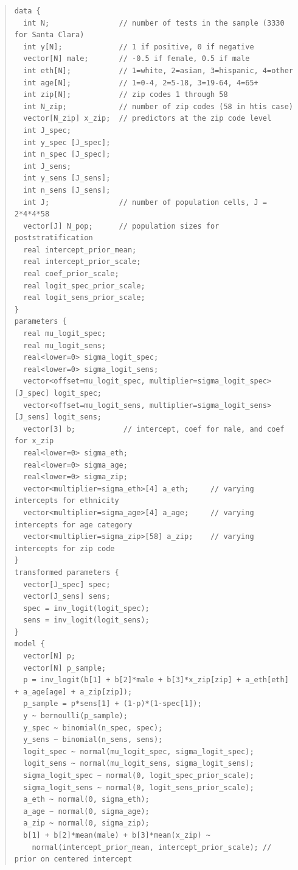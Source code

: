 \documentclass[11pt]{article}
\begin{document}
  \begin{small}
  \begin{quotation}\noindent
\begin{verbatim}
data {
  int N;                // number of tests in the sample (3330 for Santa Clara)
  int y[N];             // 1 if positive, 0 if negative
  vector[N] male;       // -0.5 if female, 0.5 if male
  int eth[N];           // 1=white, 2=asian, 3=hispanic, 4=other
  int age[N];           // 1=0-4, 2=5-18, 3=19-64, 4=65+
  int zip[N];           // zip codes 1 through 58
  int N_zip;            // number of zip codes (58 in htis case)
  vector[N_zip] x_zip;  // predictors at the zip code level
  int J_spec;
  int y_spec [J_spec];
  int n_spec [J_spec];
  int J_sens;
  int y_sens [J_sens];
  int n_sens [J_sens];
  int J;                // number of population cells, J = 2*4*4*58
  vector[J] N_pop;      // population sizes for poststratification
  real intercept_prior_mean;
  real intercept_prior_scale;
  real coef_prior_scale;
  real logit_spec_prior_scale;
  real logit_sens_prior_scale;
}
parameters {
  real mu_logit_spec;
  real mu_logit_sens;
  real<lower=0> sigma_logit_spec;
  real<lower=0> sigma_logit_sens;
  vector<offset=mu_logit_spec, multiplier=sigma_logit_spec>[J_spec] logit_spec;
  vector<offset=mu_logit_sens, multiplier=sigma_logit_sens>[J_sens] logit_sens;
  vector[3] b;           // intercept, coef for male, and coef for x_zip
  real<lower=0> sigma_eth;
  real<lower=0> sigma_age;
  real<lower=0> sigma_zip;
  vector<multiplier=sigma_eth>[4] a_eth;     // varying intercepts for ethnicity
  vector<multiplier=sigma_age>[4] a_age;     // varying intercepts for age category
  vector<multiplier=sigma_zip>[58] a_zip;    // varying intercepts for zip code
}
transformed parameters {
  vector[J_spec] spec;
  vector[J_sens] sens;
  spec = inv_logit(logit_spec);
  sens = inv_logit(logit_sens);
}
model {
  vector[N] p;
  vector[N] p_sample;
  p = inv_logit(b[1] + b[2]*male + b[3]*x_zip[zip] + a_eth[eth] + a_age[age] + a_zip[zip]);
  p_sample = p*sens[1] + (1-p)*(1-spec[1]);
  y ~ bernoulli(p_sample);
  y_spec ~ binomial(n_spec, spec);
  y_sens ~ binomial(n_sens, sens);
  logit_spec ~ normal(mu_logit_spec, sigma_logit_spec);
  logit_sens ~ normal(mu_logit_sens, sigma_logit_sens);
  sigma_logit_spec ~ normal(0, logit_spec_prior_scale);
  sigma_logit_sens ~ normal(0, logit_sens_prior_scale);
  a_eth ~ normal(0, sigma_eth);
  a_age ~ normal(0, sigma_age);
  a_zip ~ normal(0, sigma_zip);
  b[1] + b[2]*mean(male) + b[3]*mean(x_zip) ~
    normal(intercept_prior_mean, intercept_prior_scale); // prior on centered intercept

\end{verbatim}
\end{quotation}
\end{small}
\end{document}
